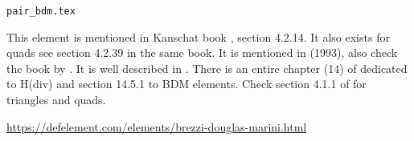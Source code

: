 \begin{flushright} {\tiny {\color{gray} \tt  pair\_bdm.tex}} \end{flushright}

This element is mentioned in Kanschat book \cite{kanschat}, section 4.2.14. 
It also exists for quads see section 4.2.39 in the same book.
It is mentioned in \textcite{chen93a} (1993), also check the book by \textcite{brfo}.
It is well described in \textcite{kanschat17}.
There is an entire chapter (14) of \textcite{ergu21_72} dedicated to H(div) and 
section 14.5.1 to BDM elements. 
Check section 4.1.1 of \cite{aubb17} for triangles and quads.

\begin{center}
\url{https://defelement.com/elements/brezzi-douglas-marini.html}
\end{center}

